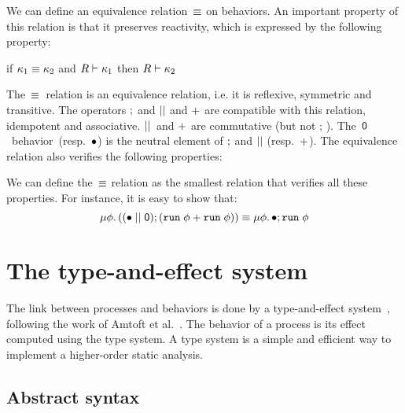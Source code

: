\documentclass[9pt]{sigplanconf}
\begin{document}
We can define an equivalence relation~$\equiv$ on behaviors. An important property of this relation is that it preserves reactivity, which is expressed by the following property:
\begin{property}
\label{prop:equiv_reactivty}
if $\kappa_1 \equiv \kappa_2$ and $R \vdash \kappa_1$ then $R \vdash \kappa_2$
\end{property}

The~$\equiv$~relation is an equivalence relation, i.e. it is reflexive, symmetric and transitive. The operators $;$ and $ \mid\mid $ and $+$ are compatible with this relation, idempotent and associative. $ \mid\mid $~and $+$ are commutative (but not $;\,$). The~$\textsf{0}$~behavior~(resp.~$\bullet$) is the neutral element of $;$ and $ \mid\mid $ (resp.~$+$). The equivalence relation also verifies the following properties:
%

We can define the~$\equiv$ relation as the smallest relation that verifies all these properties.  For instance, it is easy to show that:
\[
\mu \phi.\, ((\bullet \mid\mid \textsf{0}) ; (\mathtt{run}\; \phi + \mathtt{run}\; \phi))  \equiv  \mu \phi.\, \bullet ; \mathtt{run}\; \phi
\]

\section{The type-and-effect system}
\label{sec:type_system}

The link between processes and behaviors is done by a type-and-effect system~\cite{Lucassen:1988}, following the work of Amtoft et al.~\cite{Amtoft:1999}. The behavior of a process is its effect computed using the type system. A type system is a simple and efficient way to implement a higher-order static analysis.

\subsection{Abstract syntax}
\end{document}
